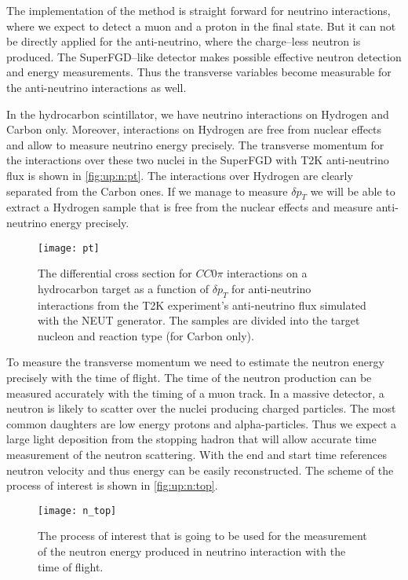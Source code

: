 \documentclass[main.tex]{subfiles}
\begin{document}
The implementation of the method is straight forward for neutrino interactions, where we expect to detect a muon and a proton in the final state. But it can not be directly applied for the anti-neutrino, where the charge--less neutron is produced. The SuperFGD--like detector makes possible effective neutron detection and energy measurements. Thus the transverse variables become measurable for the anti-neutrino interactions as well.

In the hydrocarbon scintillator, we have neutrino interactions on Hydrogen and Carbon only. Moreover, interactions on Hydrogen are free from nuclear effects and allow to measure neutrino energy precisely. The transverse momentum for the interactions over these two nuclei in the SuperFGD with T2K anti-neutrino flux is shown in \autoref{fig:up:n:pt}. The interactions over Hydrogen are clearly separated from the Carbon ones. If we manage to measure $\delta p_T$ we will be able to extract a Hydrogen sample that is free from the nuclear effects and measure anti-neutrino energy precisely.

\begin{figure}[!ht]
	\centering
	\texttt{[image: pt]}
	\caption{The differential cross section for $CC0\pi$ interactions on a hydrocarbon target as a function of $\delta p_T$ for anti-neutrino interactions from the T2K experiment’s anti-neutrino flux simulated with the NEUT generator. The samples are divided into the target nucleon and reaction type (for Carbon only).}
	\label{fig:up:n:pt}
\end{figure}

To measure the transverse momentum we need to estimate the neutron energy precisely with the time of flight. The time of the neutron production can be measured accurately with the timing of a muon track. In a massive detector, a neutron is likely to scatter over the nuclei producing charged particles. The most common daughters are low energy protons and alpha-particles. Thus we expect a large light deposition from the stopping hadron that will allow accurate time measurement of the neutron scattering. With the end and start time references neutron velocity and thus energy can be easily reconstructed. The scheme of the process of interest is shown in \autoref{fig:up:n:top}.

\begin{figure}[!ht]
	\centering
	\texttt{[image: n\_top]}
	\caption{The process of interest that is going to be used for the measurement of the neutron energy produced in neutrino interaction with the time of flight.}
	\label{fig:up:n:top}
\end{figure}
\end{document}
